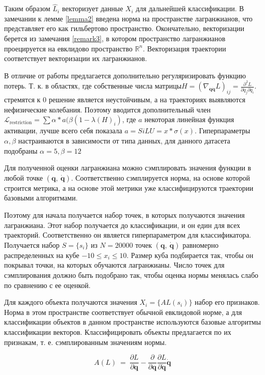 \documentclass[a4paper, 12pt]{article}
\renewcommand{\le}{\ensuremath{\leqslant}}
\begin{document}
Таким образом $\hat{L}_i$ векторизует данные $X_i$ для дальнейшей классификации. В замечании к лемме \ref{lemma2} введена норма на пространстве лагранжианов, что представляет его как гильбертово пространство. Окончательно, векторизации берется из замечания \ref{remark3}, в котором пространство лагранжианов проецируется на евклидово пространство $\mathbb{R}^n$. Векторизация траектории соответствует векторизации их лагранжианов.

В отличие от работы \cite{article} предлагается дополнительно регуляризировать функцию потерь. Т. к. в областях, где собственные числа матрицы$H = \left(\nabla_{\dot{\mathbf{q}}\dot{\mathbf{q}}} L\right)_{i j}=\frac{\partial^{2} L}{\partial \dot{q_{j}} \partial \dot{q}_{i}}.$ стремятся к 0 решение является неустойчивым, а на траекториях выявляются нефизические колебания. Поэтому вводится дополнительный член $\mathcal{L}_\text{restriction} =  \sum \alpha * a(\beta(1 - \lambda(H)_i)$, где $a$ некоторая линейная функция активации, лучше всего себя показала $a = SiLU = x*\sigma(x)$. Гиперпараметры $\alpha, \beta$ настраиваются в зависимости от типа данных, для данного датасета подобраны $\alpha = 5, \beta = 12$

Для полученной оценки лагранжиана можно сэмплировать значения функции в любой точке $(\mathbf{q},\ \mathbf{\dot{q}})$. Соответственно сэмплируется норма, на основе которой строится метрика, а на основе этой метрики уже классифицируются траектории базовыми алгоритмами.

Поэтому для начала получается набор точек, в которых получаются значения лагранжиана. Этот набор получается до классификации, и он един для всех траекторий. Соответственно он является гиперпараметром для классификатора. Получается набор $S = \{s_i\}$ из $N = 20000$ точек $(\mathbf{q},\ \mathbf{\dot{q}})$ равномерно распределенных на кубе $-10 \le {x_i} \le 10$. Размер куба подбирается так, чтобы он покрывал точки, на которых обучаются лагранжианы. Число точек для сэмплирования должно быть подобрано так, чтобы оценка нормы менялась слабо по сравнению с ее оценкой.

Для каждого объекта получаются значения $X_i = \{AL(s_i)\}$ набор его признаков. Норма в этом пространстве соответствует обычной евклидовой норме, а для классификации объектов в данном пространстве используются базовые алгоритмы классификации векторов. Классифицировать объекты предлагается по их признакам, т. е. сэмплированным значениям нормы.

\[A(L)\ =\ \frac{\partial L}{\partial \mathbf{q}}-\frac{\partial}{\partial \mathbf{q}} \frac{\partial L}{\partial \dot{\mathbf{q}}} \dot{\mathbf{q}}\]
\end{document}
